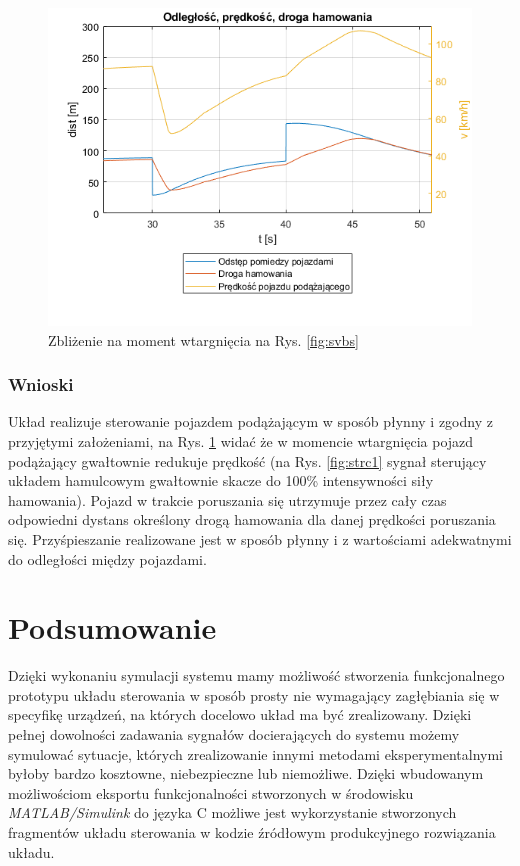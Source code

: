 \documentclass[12pt, a4paper, headings=normal]{article}
\begin{document}
\begin{figure}[H]
	\centering
	\includegraphics[width=.8\textwidth]{interupt.png}
	\caption{Zbliżenie na moment wtargnięcia na Rys. \ref{fig:svbs}}
	\label{fig:svbs_zoom}
\end{figure}

\subsubsection{Wnioski}

Układ realizuje sterowanie pojazdem podążającym w sposób płynny i zgodny z przyjętymi
założeniami, na Rys. \ref{fig:svbs_zoom} widać że w momencie wtargnięcia pojazd podążający
gwałtownie redukuje prędkość (na Rys. \ref{fig:strc1} sygnał sterujący układem hamulcowym 
gwałtownie skacze do 100\% intensywności siły hamowania). Pojazd
w trakcie poruszania się utrzymuje przez cały czas odpowiedni dystans określony
drogą hamowania dla danej prędkości poruszania się. Przyśpieszanie realizowane jest
w sposób płynny i z wartościami adekwatnymi do odległości między pojazdami.


\section{Podsumowanie}

Dzięki wykonaniu symulacji systemu mamy możliwość stworzenia funkcjonalnego prototypu
układu sterowania w sposób prosty nie wymagający zagłębiania się w specyfikę urządzeń,
na których docelowo układ ma być zrealizowany. Dzięki pełnej dowolności zadawania sygnałów
docierających do systemu możemy symulować sytuacje, których zrealizowanie innymi metodami
eksperymentalnymi byłoby bardzo kosztowne, niebezpieczne lub niemożliwe. Dzięki wbudowanym
możliwościom eksportu funkcjonalności stworzonych w środowisku \textit{MATLAB/Simulink}
do języka C możliwe jest wykorzystanie stworzonych fragmentów układu sterowania w 
kodzie źródłowym produkcyjnego rozwiązania układu.
\end{document}
